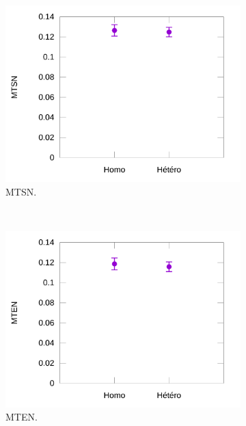 	\begin{figure}[!htb]
		\begin{subfigure}[t]{0.49\textwidth}
			\centering
			\includegraphics[width=\textwidth]{figures/ch5/normAsTimes}
			\caption{MTSN.}
			\label{fig:normAsTimes}
		\end{subfigure}
		~
		\begin{subfigure}[t]{0.49\textwidth}
			\centering
			\includegraphics[width=\textwidth]{figures/ch5/normAsErrors}
			\caption{MTEN.}
			\label{fig:normAsErrors}
		\end{subfigure}
		~
		\begin{subfigure}[t]{0.49\textwidth}
			\centering

\end{subfigure}
\end{figure}
